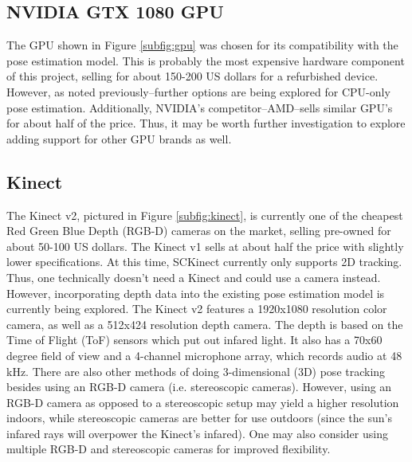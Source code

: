 \documentclass{article}
\begin{document}
\subsection{NVIDIA GTX 1080 GPU}\label{subsec:nvidia_gtx_1080_gpu}
The GPU shown in Figure \ref{subfig:gpu} was chosen for its compatibility with the pose estimation model. This is probably the most expensive hardware component of this project, selling for about 150-200 US dollars for a refurbished device. However, as noted previously--further options are being explored for CPU-only pose estimation. Additionally, NVIDIA's competitor--AMD--sells similar GPU's for about half of the price. Thus, it may be worth further investigation to explore adding support for other GPU brands as well.
\subsection{Kinect}\label{subsec:kinect}
The Kinect v2, pictured in Figure \ref{subfig:kinect}, is currently one of the cheapest Red Green Blue Depth (RGB-D) cameras on the market, selling pre-owned for about 50-100 US dollars. The Kinect v1 sells at about half the price with slightly lower specifications. At this time, SCKinect currently only supports 2D tracking. Thus, one technically doesn't need a Kinect and could use a camera instead. However, incorporating depth data into the existing pose estimation model is currently being explored. The Kinect v2 features a 1920x1080 resolution color camera, as well as a 512x424 resolution depth camera. The depth is based on the Time of Flight (ToF) sensors which put out infared light. It also has a 70x60 degree field of view and a 4-channel microphone array, which records audio at 48 kHz. There are also other methods of doing 3-dimensional (3D) pose tracking besides using an RGB-D camera (i.e. stereoscopic cameras). However, using an RGB-D camera as opposed to a stereoscopic setup may yield a higher resolution indoors, while stereoscopic cameras are better for use outdoors (since the sun's infared rays will overpower the Kinect's infared). One may also consider using multiple RGB-D and stereoscopic cameras for improved flexibility.
\end{document}
